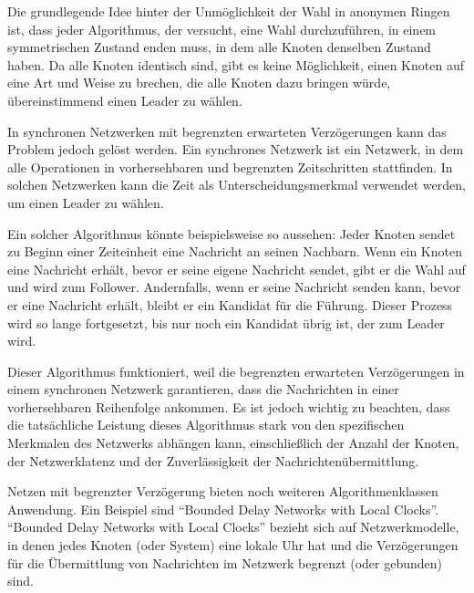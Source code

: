 Die grundlegende Idee hinter der Unmöglichkeit der Wahl in anonymen Ringen ist, dass jeder Algorithmus, der versucht, eine Wahl durchzuführen, in einem symmetrischen Zustand enden muss, in dem alle Knoten denselben Zustand haben. Da alle Knoten identisch sind, gibt es keine Möglichkeit, einen Knoten auf eine Art und Weise zu brechen, die alle Knoten dazu bringen würde, übereinstimmend einen Leader zu wählen.

In synchronen Netzwerken mit begrenzten erwarteten Verzögerungen kann das Problem jedoch gelöst werden. Ein synchrones Netzwerk ist ein Netzwerk, in dem alle Operationen in vorhersehbaren und begrenzten Zeitschritten stattfinden. In solchen Netzwerken kann die Zeit als Unterscheidungsmerkmal verwendet werden, um einen Leader zu wählen.

Ein solcher Algorithmus könnte beispielsweise so aussehen: Jeder Knoten sendet zu Beginn einer Zeiteinheit eine Nachricht an seinen Nachbarn. Wenn ein Knoten eine Nachricht erhält, bevor er seine eigene Nachricht sendet, gibt er die Wahl auf und wird zum Follower. Andernfalls, wenn er seine Nachricht senden kann, bevor er eine Nachricht erhält, bleibt er ein Kandidat für die Führung. Dieser Prozess wird so lange fortgesetzt, bis nur noch ein Kandidat übrig ist, der zum Leader wird.

Dieser Algorithmus funktioniert, weil die begrenzten erwarteten Verzögerungen in einem synchronen Netzwerk garantieren, dass die Nachrichten in einer vorhersehbaren Reihenfolge ankommen. Es ist jedoch wichtig zu beachten, dass die tatsächliche Leistung dieses Algorithmus stark von den spezifischen Merkmalen des Netzwerks abhängen kann, einschließlich der Anzahl der Knoten, der Netzwerklatenz und der Zuverlässigkeit der Nachrichtenübermittlung.

Netzen mit begrenzter Verzögerung bieten noch weiteren Algorithmenklassen Anwendung. Ein Beispiel sind \enquote{Bounded Delay Networks with Local Clocks}. \enquote{Bounded Delay Networks with Local Clocks} bezieht sich auf Netzwerkmodelle, in denen jedes Knoten (oder System) eine lokale Uhr hat und die Verzögerungen für die Übermittlung von Nachrichten im Netzwerk begrenzt (oder gebunden) sind.

